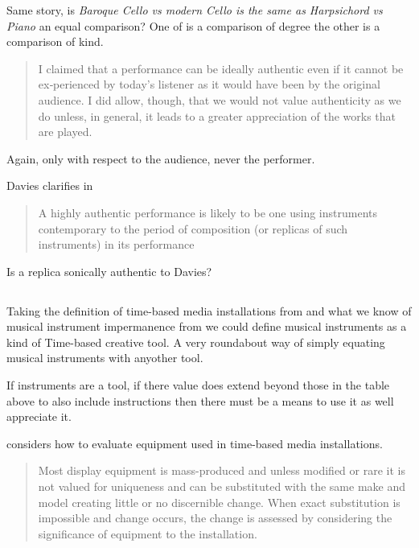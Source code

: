 Same story, is \textit{Baroque Cello vs modern Cello is the same as Harpsichord
vs Piano} an equal comparison? One of is a comparison of degree the other is a
comparison of kind.


\begin{quotation}
I claimed that a performance can be ideally authentic even if it cannot be
ex‐perienced by today's listener as it would have been by the original audience.
I did allow, though, that we would not value authenticity as we do unless, in
general, it leads to a greater appreciation of the works that are played.
\end{quotation}

Again, only with respect to the audience, never the performer.




Davies clarifies in 

\begin{quotation}
    A highly
authentic performance is likely to be one using instruments contemporary to
the period of composition (or replicas of such instruments) in its performance
\end{quotation}

Is a replica sonically authentic to Davies?

\subsection{\cite{laurenson_management_2005}}

Taking the definition of time-based media installations from
\cite{laurenson_management_2005} and what we know of musical instrument
impermanence from \cite{fritz_listener_2017} we could define musical instruments
as a kind of Time-based creative tool. A very roundabout way of simply equating
musical instruments with anyother tool.

If instruments are a tool, if there value does extend beyond those in the table
above to also include instructions then there must be a means to use it as well
appreciate it.

\cite{laurenson_management_2005} considers how to evaluate equipment used in
time-based media installations.

\begin{quotation}
    Most display equipment is mass-produced and unless modified or rare it is
    not valued for uniqueness and can be substituted with the same make and
    model creating little or no discernible change. When exact substitution is
    impossible and change occurs, the change is assessed by considering the
    significance of equipment to the installation.
\end{quotation}

